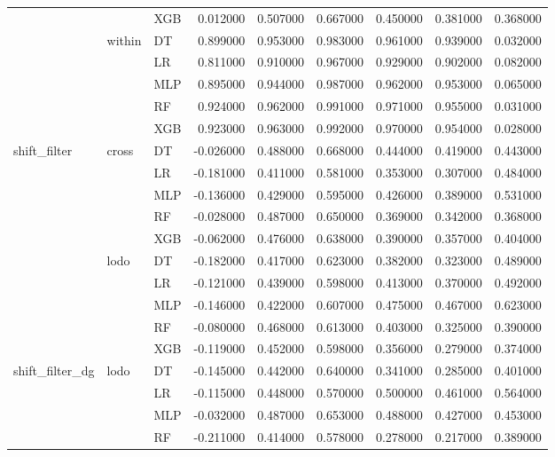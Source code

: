 \begin{tabular}{lllrrrrrr}
 &  & XGB & 0.012000 & 0.507000 & 0.667000 & 0.450000 & 0.381000 & 0.368000 \\
\cline{2-9}
 & \multirow[t]{5}{*}{within} & DT & 0.899000 & 0.953000 & 0.983000 & 0.961000 & 0.939000 & 0.032000 \\
 &  & LR & 0.811000 & 0.910000 & 0.967000 & 0.929000 & 0.902000 & 0.082000 \\
 &  & MLP & 0.895000 & 0.944000 & 0.987000 & 0.962000 & 0.953000 & 0.065000 \\
 &  & RF & 0.924000 & 0.962000 & 0.991000 & 0.971000 & 0.955000 & 0.031000 \\
 &  & XGB & 0.923000 & 0.963000 & 0.992000 & 0.970000 & 0.954000 & 0.028000 \\
\cline{1-9} \cline{2-9}
\multirow[t]{10}{*}{shift_filter} & \multirow[t]{5}{*}{cross} & DT & -0.026000 & 0.488000 & 0.668000 & 0.444000 & 0.419000 & 0.443000 \\
 &  & LR & -0.181000 & 0.411000 & 0.581000 & 0.353000 & 0.307000 & 0.484000 \\
 &  & MLP & -0.136000 & 0.429000 & 0.595000 & 0.426000 & 0.389000 & 0.531000 \\
 &  & RF & -0.028000 & 0.487000 & 0.650000 & 0.369000 & 0.342000 & 0.368000 \\
 &  & XGB & -0.062000 & 0.476000 & 0.638000 & 0.390000 & 0.357000 & 0.404000 \\
\cline{2-9}
 & \multirow[t]{5}{*}{lodo} & DT & -0.182000 & 0.417000 & 0.623000 & 0.382000 & 0.323000 & 0.489000 \\
 &  & LR & -0.121000 & 0.439000 & 0.598000 & 0.413000 & 0.370000 & 0.492000 \\
 &  & MLP & -0.146000 & 0.422000 & 0.607000 & 0.475000 & 0.467000 & 0.623000 \\
 &  & RF & -0.080000 & 0.468000 & 0.613000 & 0.403000 & 0.325000 & 0.390000 \\
 &  & XGB & -0.119000 & 0.452000 & 0.598000 & 0.356000 & 0.279000 & 0.374000 \\
\cline{1-9} \cline{2-9}
\multirow[t]{5}{*}{shift_filter_dg} & \multirow[t]{5}{*}{lodo} & DT & -0.145000 & 0.442000 & 0.640000 & 0.341000 & 0.285000 & 0.401000 \\
 &  & LR & -0.115000 & 0.448000 & 0.570000 & 0.500000 & 0.461000 & 0.564000 \\
 &  & MLP & -0.032000 & 0.487000 & 0.653000 & 0.488000 & 0.427000 & 0.453000 \\
 &  & RF & -0.211000 & 0.414000 & 0.578000 & 0.278000 & 0.217000 & 0.389000 \\

\end{tabular}
